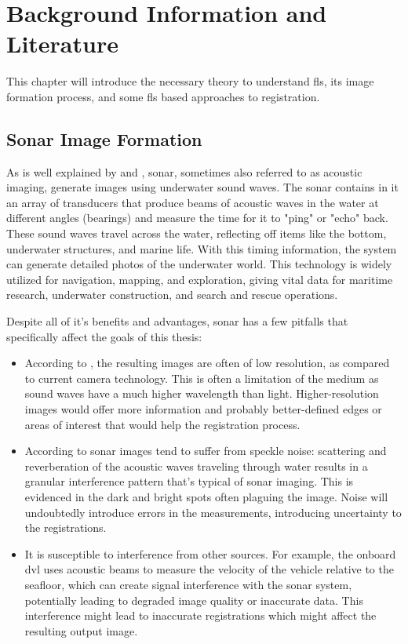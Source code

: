 \chapter{Background Information and Literature}
\label{chap:background}

This chapter will introduce the necessary theory to understand \acrshort{fls}, its image formation process, and some \acrshort{fls} based approaches to registration.  

\section{Sonar Image Formation}

As is well explained by \citeauthor{noaaExplorationTools}\cite{noaaExplorationTools} and \citeauthor{Hurtos2015}\cite{Hurtos2015}, \acrfull{sonar}, sometimes also referred to as acoustic imaging, generate images using underwater sound waves. The \acrshort{sonar} contains in it an array of transducers that produce beams of acoustic waves in the water at different angles (bearings) and measure the time for it to "ping" or "echo" back. These sound waves travel across the water, reflecting off items like the bottom, underwater structures, and marine life. With this timing information, the system can generate detailed photos of the underwater world. This technology is widely utilized for navigation, mapping, and exploration, giving vital data for maritime research, underwater construction, and search and rescue operations.

Despite all of it's benefits and advantages, \acrshort{sonar} has a few pitfalls that specifically affect the goals of this thesis: 
\begin{itemize}
    \item According to \citeauthor{Hurtos2015}\cite{Hurtos2015}, the resulting images are often of low resolution, as compared to current camera technology. This is often a limitation of the medium as sound waves have a much higher wavelength than light. Higher-resolution images would offer more information and probably better-defined edges or areas of interest that would help the registration process.
    \item According to \citeauthor{Huang2020}\cite{Huang2020} sonar images tend to suffer from speckle noise: scattering and reverberation of the acoustic waves traveling through water results in a granular interference pattern that's typical of \acrshort{sonar} imaging. This is evidenced in the dark and bright spots often plaguing the image. Noise will undoubtedly introduce errors in the measurements, introducing uncertainty to the registrations. 
    \item It is susceptible to interference from other sources. For example, the onboard \acrshort{dvl} uses acoustic beams to measure the velocity of the vehicle relative to the seafloor, which can create signal interference with the sonar system, potentially leading to degraded image quality or inaccurate data. This interference might lead to inaccurate registrations which might affect the resulting output image.
\end{itemize}


